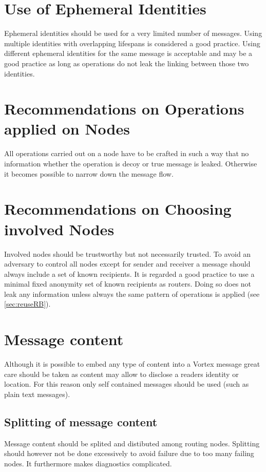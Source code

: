 \section{Use of Ephemeral Identities}
Ephemeral identities should be used for a very limited number of messages. Using multiple identities with overlapping lifespans is considered a good practice. Using different ephemeral identities for the same message is acceptable and may be a good practice as long as operations do not leak the linking between those two identities.

\section{Recommendations on Operations applied on Nodes}
All operations carried out on a node have to be crafted in such a way that no information whether the operation is decoy or true message is leaked. Otherwise it becomes possible to narrow down the message flow.

\section{Recommendations on Choosing involved Nodes}
Involved nodes should be trustworthy but not necessarily trusted. To avoid an adversary to control all nodes except for sender and receiver a message should always include a set of known recipients. It is regarded a good practice to use a minimal fixed anonymity set of known recipients as routers. Doing so does not leak any information unless always the same pattern of operations is applied (see \ref{sec:reuseRB}).

\section{Message content}
Although it is possible to embed any type of content into a Vortex message great care should be taken as content may allow to disclose a readers identity or location. For this reason only self contained messages should be used (such as plain text messages).

\subsection{Splitting of message content}
Message content should be splited and distibuted among routing nodes. Splitting should however not be done excessively to avoid failure due to too many failing nodes. It furthermore makes diagnostics complicated. 

